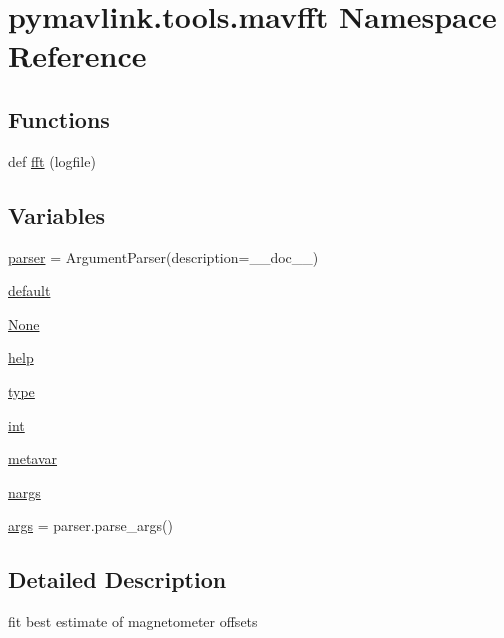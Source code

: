 \hypertarget{namespacepymavlink_1_1tools_1_1mavfft}{}\section{pymavlink.\+tools.\+mavfft Namespace Reference}
\label{namespacepymavlink_1_1tools_1_1mavfft}
\subsection*{Functions}
\begin{DoxyCompactItemize}
\item 
def \mbox{\hyperlink{namespacepymavlink_1_1tools_1_1mavfft_a319827e54762dc95afaa783e0ff75ca0}{fft}} (logfile)
\end{DoxyCompactItemize}
\subsection*{Variables}
\begin{DoxyCompactItemize}
\item 
\mbox{\hyperlink{namespacepymavlink_1_1tools_1_1mavfft_aeefff5b5d4586e2de038a7784d8290e3}{parser}} = Argument\+Parser(description=\+\_\+\+\_\+doc\+\_\+\+\_\+)
\item 
\mbox{\hyperlink{namespacepymavlink_1_1tools_1_1mavfft_a176dc3b4a930e040a54e857135ae89ef}{default}}
\item 
\mbox{\hyperlink{namespacepymavlink_1_1tools_1_1mavfft_ac2776f5146774e469684227be65af80b}{None}}
\item 
\mbox{\hyperlink{namespacepymavlink_1_1tools_1_1mavfft_afe1d8f6eb1ecd9475d12b961a1484eb8}{help}}
\item 
\mbox{\hyperlink{namespacepymavlink_1_1tools_1_1mavfft_a488028bdac60da515403f7272fb00ccc}{type}}
\item 
\mbox{\hyperlink{namespacepymavlink_1_1tools_1_1mavfft_aeef12cf59f3d58e410d27fe77d9a881a}{int}}
\item 
\mbox{\hyperlink{namespacepymavlink_1_1tools_1_1mavfft_acb7ef77f6da41e5c1bf7f0fe4c5af8c8}{metavar}}
\item 
\mbox{\hyperlink{namespacepymavlink_1_1tools_1_1mavfft_a910befdb642f7224a1886250308b87d4}{nargs}}
\item 
\mbox{\hyperlink{namespacepymavlink_1_1tools_1_1mavfft_ae74b1a50e94b5c998151033eb2d6879a}{args}} = parser.\+parse\+\_\+args()
\end{DoxyCompactItemize}


\subsection{Detailed Description}
\begin{DoxyVerb}fit best estimate of magnetometer offsets
\end{DoxyVerb}
 

